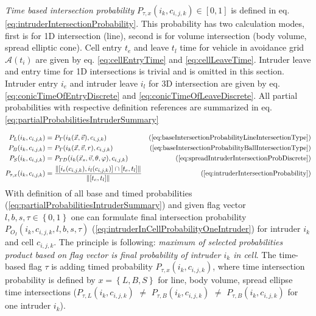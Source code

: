 \emph{Time based intersection probability} $P_{\tau,x}(i_k,c_{i,j,k})\in[0,1]$ is defined in eq. \ref{eq:intruderIntersectionProbability}. This probability has two calculation modes, first is for 1D intersection (line), second is for volume intersection (body volume, spread elliptic cone).  Cell entry $t_e$ and leave $t_l$ time for vehicle in avoidance grid $\mathscr{A}(t_i)$ are given by eq. \ref{eq:cellEntryTime} and \ref{eq:cellLeaveTime}. Intruder leave and entry time for 1D intersections is trivial and is omitted in this section. Intruder entry $i_e$ and intruder leave $i_l$ for 3D intersection are given by eq. \ref{eq:conicTimeOfEntryDiscrete} and \ref{eq:conicTimeOfLeaveDiscrete}. All partial probabilities with respective definition references are summarized in eq. \ref{eq:partialProbabilitiesIntruderSummary}

\begin{equation}\label{eq:partialProbabilitiesIntruderSummary}
    \begin{aligned}
        P_L(i_k,c_{i,j,k}) &= P_T(i_k(\vec{x},\vec{v}),c_{i,j,k}) &(\ref{eq:baseIntersectionProbabilityLineIntersectionType})\\
        P_B(i_k,c_{i,j,k}) &= P_T(i_k(\vec{x},\vec{v},r),c_{i,j,k}) &(\ref{eq:baseIntersectionProbabilityBallIntersectionType})\\
        P_S(i_k,c_{i,j,k}) &= P_{TD}(i_k(\vec{x}_s,\vec{v},\theta,\varphi),c_{i,j,k}) &(\ref{eq:spreadIntruderIntersectionProbDiscrete})\\
        P_{\tau,x}(i_k,c_{i,j,k})&=\frac{\left\lVert[i_e(c_{i,j,k}),i_l(c_{i,j,k})]\cap [t_e,t_l]\right\rVert}{\left\lVert[t_e,t_l]\right\rVert}& (\ref{eq:intruderIntersectionProbability})\\
    \end{aligned}
\end{equation}
\noindent With definition of all base and timed probabilities (\ref{eq:partialProbabilitiesIntruderSummary}) and given flag vector $l,b,s,\tau \in\left\{0,1\right\}$ one can formulate final intersection probability $P_{O_I}(i_k,c_{i,j,k},l,b,s,\tau)$ (\ref{eq:intruderInCellProbabilityOneIntruder}) for intruder $i_k$ and cell $c_{i,j,k}$. The principle is following: \emph{maximum of selected probabilities product based on flag vector is final probability of intruder $i_k$ in cell}. The time-based flag $\tau$ is adding timed probability $P_{\tau,x}(i_k,c_{i,j,k})$, where time intersection probability is defined by $x=\left\{L,B,S\right\}$ for line, body volume, spread ellipse time intersections ($P_{\tau,L}(i_k,c_{i,j,k})$ $\neq$ $P_{\tau,B}(i_k,c_{i,j,k})$ $\neq$ $P_{\tau,B}(i_k,c_{i,j,k})$ for one intruder $i_k$).

